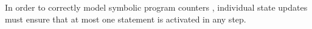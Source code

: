 In order to correctly model symbolic program counters , individual state updates must ensure that at most one statement is activated in any step.
